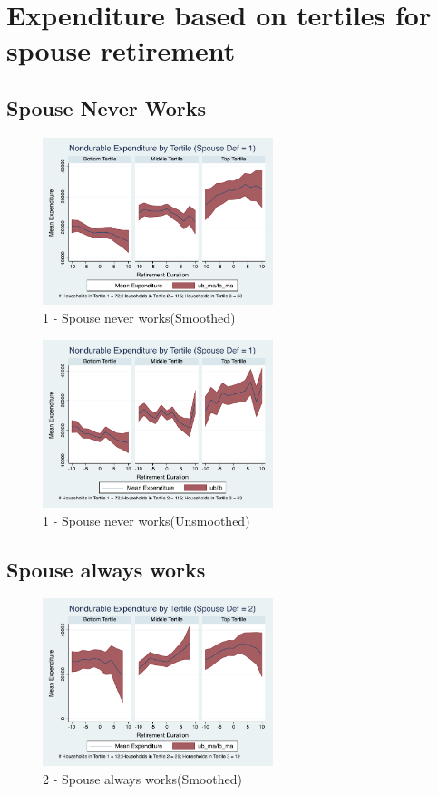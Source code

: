 \documentclass[11pt]{article}
\begin{document}
\clearpage
\section{Expenditure based on tertiles for spouse retirement}

\subsection{Spouse Never Works}

\begin{figure}[h]
	\caption{1 - Spouse never works(Smoothed)}
	\centering
	\includegraphics[width=0.6\textwidth]{../ConsumptionPostRetirement_by_SpouseDef/Smoothed/spouse_def_1.pdf}
\end{figure}

\begin{figure}[h]
	\caption{1 - Spouse never works(Unsmoothed)}
	\centering
	\includegraphics[width=0.6\textwidth]{../ConsumptionPostRetirement_by_SpouseDef/UnSmoothed/spouse_def_1.pdf}
\end{figure}
\clearpage


\subsection{Spouse always works}
\begin{figure}[h]
	\caption{2 - Spouse always works(Smoothed)}
	\centering
	\includegraphics[width=0.6\textwidth]{../ConsumptionPostRetirement_by_SpouseDef/Smoothed/spouse_def_2.pdf}
\end{figure}
\end{document}
